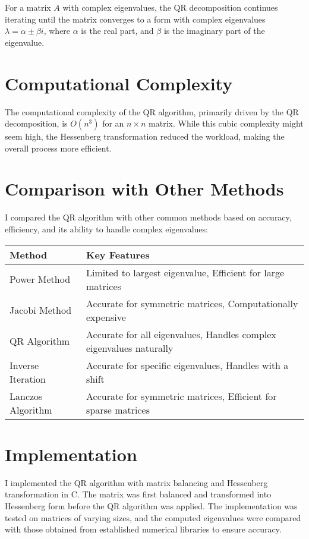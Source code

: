 \documentclass{article}
\begin{document}
For a matrix $ A $ with complex eigenvalues, the QR decomposition continues iterating until the matrix converges to a form with complex eigenvalues $ \lambda = \alpha \pm \beta i $, where $ \alpha $ is the real part, and $ \beta $ is the imaginary part of the eigenvalue.

\section{Computational Complexity}
The computational complexity of the QR algorithm, primarily driven by the QR decomposition, is $ O(n^3) $ for an $ n \times n $ matrix. While this cubic complexity might seem high, the Hessenberg transformation reduced the workload, making the overall process more efficient.

\section{Comparison with Other Methods}
I compared the QR algorithm with other common methods based on accuracy, efficiency, and its ability to handle complex eigenvalues:
\begin{table}[h]
\centering
\begin{tabular}{|l|l|}
\toprule
Method & Key Features \\ \midrule
Power Method            & Limited to largest eigenvalue, Efficient for large matrices \\
Jacobi Method           & Accurate for symmetric matrices, Computationally expensive \\
QR Algorithm            & Accurate for all eigenvalues, Handles complex eigenvalues naturally \\
Inverse Iteration       & Accurate for specific eigenvalues, Handles with a shift \\
Lanczos Algorithm       & Accurate for symmetric matrices, Efficient for sparse matrices \\ \bottomrule
\end{tabular}
\end{table}

\section{Implementation}
I implemented the QR algorithm with matrix balancing and Hessenberg transformation in C. The matrix was first balanced and transformed into Hessenberg form before the QR algorithm was applied. The implementation was tested on matrices of varying sizes, and the computed eigenvalues were compared with those obtained from established numerical libraries to ensure accuracy.
\end{document}
